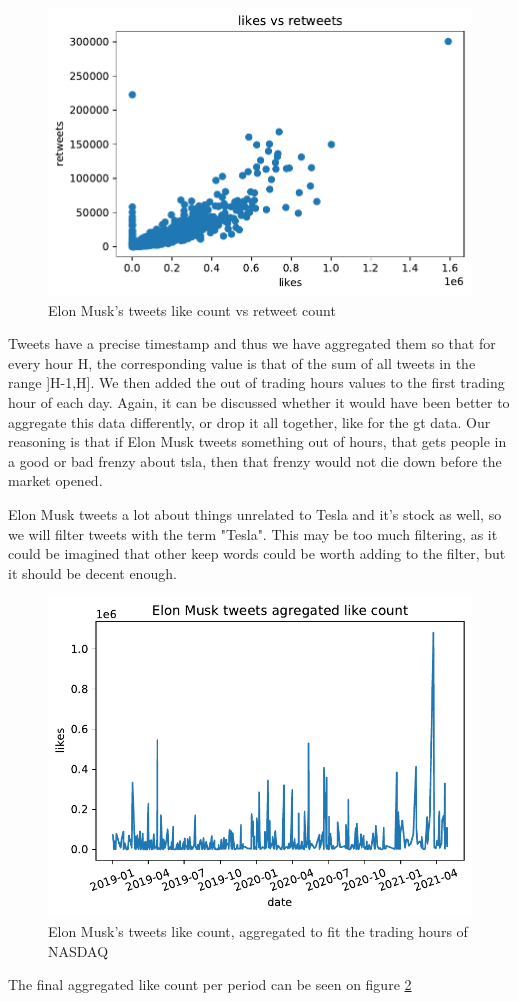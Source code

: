\begin{figure}[h]
	\centering
	\includegraphics[width=\textwidth]{img/img_likeretweets.pdf}
	\caption{Elon Musk's tweets like count vs retweet count}
	\label{fig:likeretweets}
\end{figure}


Tweets have a precise timestamp and thus we have aggregated them so that for every hour H, the corresponding value is that of the sum of all tweets in the range ]H-1,H]. We then added the out of trading hours values to the first trading hour of each day. Again, it can be discussed whether it would have been better to aggregate this data differently, or drop it all together, like for the \acrlong{gt} data. Our reasoning is that if Elon Musk tweets something out of hours, that gets people in a good or bad frenzy about \acrshort{tsla}, then that frenzy would not die down before the market opened.

Elon Musk tweets a lot about things unrelated to Tesla and it's stock as well, so we will filter tweets with the term "Tesla". This may be too much filtering, as it could be imagined that other keep words could be worth adding to the filter, but it should be decent enough.

\begin{figure}[h]
	\centering
	\includegraphics[width=\textwidth]{img/img_agglikes.pdf}
	\caption{Elon Musk's tweets like count, aggregated to fit the trading hours of NASDAQ}
	\label{fig:agglikes}
\end{figure}

The final aggregated like count per period can be seen on figure \ref{fig:agglikes}